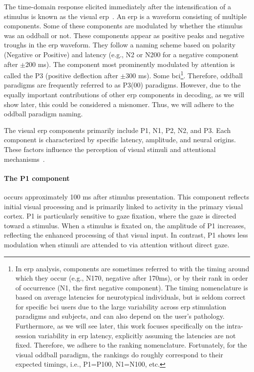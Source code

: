 The time-domain response elicited immediately after the intensification of a stimulus is
known as the visual \ac{erp}~\cite{Luck2014}.
An \ac{erp} is a waveform consisting of multiple components.
Some of these components are modulated by whether the stimulus was an oddball or not.
These components appear as positive peaks and negative troughs in the \ac{erp} waveform.
They follow a naming scheme based on polarity (Negative or Positive) and latency (e.g.,
N2 or N200 for a negative component after $\pm200$ ms).
The component most prominently modulated by attention is called the P3 (positive
deflection after $\pm300$ ms).
Some \ac{bci}\footnote{In \ac{erp} analysis, components are sometimes referred to with
the timing around which they occur (e.g., N170, negative after 170ms), or by their rank
in order of occurrence (N1, the first negative component).
The timing nomenclature is based on average latencies for neurotypical individuals, but
is seldom correct for specific \ac{bci} users due to the large variability across
\ac{erp} stimulation paradigms and subjects, and can also depend on the user's pathology.
Furthermore, as we will see later, this work focuses specifically on the intra-session
variability in \ac{erp} latency, explicitly assuming the latencies are not fixed.
Therefore, we adhere to the ranking nomenclature.
Fortunately, for the visual oddball paradigm, the rankings do roughly correspond to
their expected timings, i.e., P1=P100, N1=N100, etc.}.
Therefore, oddball paradigms are frequently referred to as P3(00) paradigms.
However, due to the equally important contributions of other \ac{erp} components in
decoding, as we will show later, this could be considered a misnomer.
Thus, we will adhere to the oddball paradigm naming.

The visual \ac{erp} components primarily include P1, N1, P2, N2, and P3.
Each component is characterized by specific latency, amplitude, and neural origins.
These factors influence the perception of visual stimuli and attentional
mechanisms~\cite{Luck2013}.

\paragraph{The P1 component} occurs approximately 100 ms after stimulus presentation.
This component reflects initial visual processing and is primarily linked to activity in
the primary visual cortex.
P1 is particularly sensitive to gaze fixation, where the gaze is directed toward a
stimulus.
When a stimulus is fixated on, the amplitude of P1 increases, reflecting the enhanced
processing of that visual input.
In contrast, P1 shows less modulation when stimuli are attended to via attention without
direct gaze.

